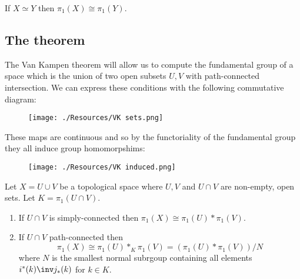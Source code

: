 \documentclass[12pt, a4paper]{article}
\begin{document}
\begin{mdprop}
    If \(X \simeq Y\) then \(\pi_1(X) \cong \pi_1(Y)\).
\end{mdprop}

\subsection{The theorem}

The Van Kampen theorem will allow us to compute the fundamental group of a space which is the union of two open subsets \(U,V\) with path-connected intersection. We can express these conditions with the following commutative diagram:

\begin{figure}[H]
     \begin{center}
         \texttt{[image: ./Resources/VK sets.png]}
     \end{center}
\end{figure}

\noindent These maps are continuous and so by the functoriality of the fundamental group they all induce group homomorpshims:

\begin{figure}[H]
     \begin{center}
         \texttt{[image: ./Resources/VK induced.png]}
     \end{center}
\end{figure}

\begin{mdthm}
    Let \(X = U \cup V\) be a topological space where \(U,V\) and \(U\cap V\) are non-empty, open sets. Let \(K = \pi_1(U \cap V)\).
    \begin{enumerate}
        \item If \(U \cap V\) is simply-connected then \(\pi_1(X) \cong \pi_1(U) * \pi_1(V)\).
        \item If \(U \cap V\) path-connected then 
        \[\pi_1(X) \cong \pi_1(U) *_K \pi_1(V) = (\pi_1(U) * \pi_1(V))/N\]
        where \(N\) is the smallest normal subrgoup containing all elements \(i^*(k)\inv j_*(k)\) for \(k \in K\).
    \end{enumerate}
\end{mdthm}
\end{document}
